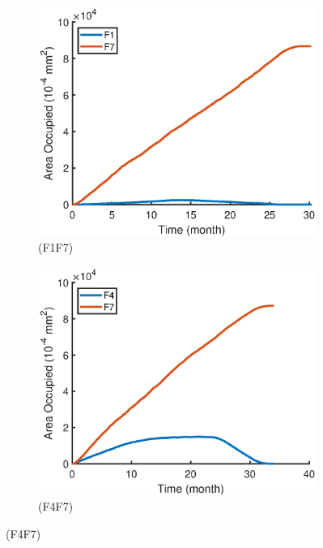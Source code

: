 \documentclass[a4paper,12pt]{article}
\begin{document}
\vspace{-0.3cm}
\begin{figure}[H]
\centering 
\begin{subfigure}{0.4\textwidth}
	\includegraphics[width=\textwidth]{./4/noE_F1F7_area.eps}
	\caption{(F1F7)}
	\label{noE_F1F7_area}
\end{subfigure}
\begin{subfigure}{0.4\textwidth}
	\includegraphics[width=\textwidth]{./4/noE_F4F7_area.eps}
	\caption{(F4F7)}
	\label{noE_F4F7_area}
\end{subfigure}

\end{figure}
\end{document}
